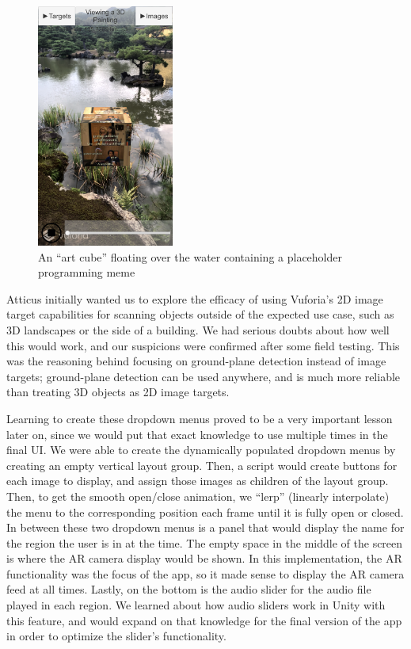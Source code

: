 \documentclass[a4paper, 10pt, american, titlepage]{article}
\begin{document}
\begin{figure}[h]
	\centering
	\includegraphics[width=0.4\textwidth]{floating-cube.png}
	\caption{An ``art cube'' floating over the water containing a placeholder
    programming meme}
	\label{fig:floatingCube}
\end{figure}

Atticus initially wanted us to explore the efficacy of using Vuforia's 2D image
target capabilities for scanning objects outside of the expected use case, such
as 3D landscapes or the side of a building. We had serious doubts about how
well this would work, and our suspicions were confirmed after some field
testing. This was the reasoning behind focusing on ground-plane detection
instead of image targets; ground-plane detection can be used anywhere, and is
much more reliable than treating 3D objects as 2D image targets.

Learning to create these dropdown menus proved to be a very important lesson
later on, since we would put that exact knowledge to use multiple times in the
final UI. We were able to create the dynamically populated dropdown menus by
creating an empty vertical layout group. Then, a script would create buttons for
each image to display, and assign those images as children of the layout group.
Then, to get the smooth open/close animation, we ``lerp'' (linearly interpolate)
the menu to the corresponding position each frame until it is fully open or
closed. In between these two dropdown menus is a panel that would display the
name for the region the user is in at the time. The empty space in the middle of
the screen is where the AR camera display would be shown. In this
implementation, the AR functionality was the focus of the app, so it made sense
to display the AR camera feed at all times. Lastly, on the bottom is the audio
slider for the audio file played in each region. We learned about how audio
sliders work in Unity with this feature, and would expand on that knowledge for
the final version of the app in order to optimize the slider's functionality.
\end{document}
